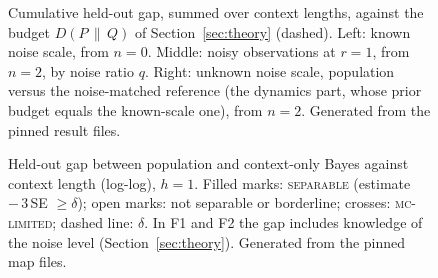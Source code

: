 \begin{figure}[t]
\centering

\caption{Cumulative held-out gap, summed over context lengths, against the budget $D(P\,\|\,Q)$ of
Section~\ref{sec:theory} (dashed). Left: known noise scale, from $n=0$. Middle: noisy observations at $r=1$, from $n=2$, by
noise ratio $q$. Right: unknown noise scale, population versus the noise-matched reference (the dynamics part, whose prior
budget equals the known-scale one), from $n=2$. Generated from the pinned result files.}
\label{fig:cumulative}
\end{figure}

\begin{figure}[t]
\centering

\caption{Held-out gap between population and context-only Bayes against context length (log-log), $h=1$. Filled marks:
\textsc{separable} (estimate $-\,3\,$SE $\ge\delta$); open marks: not separable or borderline; crosses: \textsc{mc-limited};
dashed line: $\delta$. In F1 and F2 the gap includes knowledge of the noise level (Section~\ref{sec:theory}). Generated from
the pinned map files.}
\label{fig:gap}
\end{figure}

\begin{table}[t]
\centering\scriptsize

\caption{Held-out systems, $h=1$: each map's grid of context lengths $n$; the context lengths at which population and
context-only Bayes are \textsc{separable}, with the range of separable gaps in nats; and the number of \textsc{borderline}
cells whose point estimate already reaches $\delta$ (``none'': no separable cell; the largest gap is shown). $^*$: the window
reaches the last grid point, so its end is not mapped. Generated from the pinned map files.}
\label{tab:maps}
\end{table}

